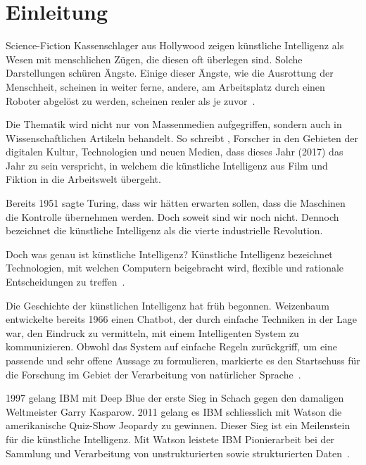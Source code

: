 \section{Einleitung}

Science-Fiction Kassenschlager aus Hollywood zeigen künstliche Intelligenz als Wesen mit menschlichen Zügen, die diesen oft überlegen sind. Solche Darstellungen schüren Ängste. Einige dieser Ängste, wie die Ausrottung der Menschheit, scheinen in weiter ferne, andere, am Arbeitsplatz durch einen Roboter abgelöst zu werden, scheinen realer als je zuvor~\autocite{Lu2018}.

Die Thematik wird nicht nur von Massenmedien aufgegriffen, sondern auch in Wissenschaftlichen Artikeln behandelt. So schreibt \textcite{Tredinnick2017}, Forscher in den Gebieten der digitalen Kultur, Technologien und neuen Medien, dass dieses Jahr (2017) das Jahr zu sein verspricht, in welchem die künstliche Intelligenz aus Film und Fiktion in die Arbeitswelt übergeht. 

Bereits 1951 sagte Turing, dass wir hätten erwarten sollen, dass die Maschinen die Kontrolle übernehmen werden. Doch soweit sind wir noch nicht. Dennoch bezeichnet \textcite{Tredinnick2017} die künstliche Intelligenz als die vierte industrielle Revolution.

Doch was genau ist künstliche Intelligenz? Künstliche Intelligenz bezeichnet Technologien, mit welchen Computern beigebracht wird, flexible und rationale Entscheidungen zu treffen~\autocite{Tredinnick2017}.

Die Geschichte der künstlichen Intelligenz hat früh begonnen. Weizenbaum  entwickelte bereits 1966 einen Chatbot, der durch einfache Techniken in der Lage war, den Eindruck zu vermitteln, mit einem Intelligenten System zu kommunizieren. Obwohl das System auf einfache Regeln zurückgriff, um eine passende und sehr offene Aussage zu formulieren, markierte es den Startschuss für die Forschung im Gebiet der Verarbeitung von natürlicher Sprache~\autocite{Tredinnick2017}. 

1997 gelang IBM mit Deep Blue der erste Sieg in Schach gegen den damaligen Weltmeister Garry Kasparow. 2011 gelang es IBM schliesslich mit Watson die amerikanische Quiz-Show Jeopardy zu gewinnen. Dieser Sieg ist ein Meilenstein für die künstliche Intelligenz. Mit Watson leistete IBM Pionierarbeit bei der Sammlung und Verarbeitung von unstrukturierten sowie strukturierten Daten~\autocite{Tredinnick2017}.

